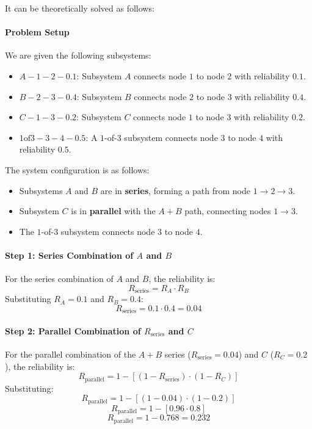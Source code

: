 \documentclass[12pt	]{article}
\begin{document}
It can be theoretically solved as follows:


\paragraph{Problem Setup}
We are given the following subsystems:
\begin{itemize}
	\item $A-1-2-0.1$: Subsystem $A$ connects node $1$ to node $2$ with reliability $0.1$.
	\item $B-2-3-0.4$: Subsystem $B$ connects node $2$ to node $3$ with reliability $0.4$.
	\item $C-1-3-0.2$: Subsystem $C$ connects node $1$ to node $3$ with reliability $0.2$.
	\item $1\text{of}3-3-4-0.5$: A $1$-of-$3$ subsystem connects node $3$ to node $4$ with reliability $0.5$.
\end{itemize}

The system configuration is as follows:
\begin{itemize}
	\item Subsystems $A$ and $B$ are in \textbf{series}, forming a path from node $1 \to 2 \to 3$.
	\item Subsystem $C$ is in \textbf{parallel} with the $A+B$ path, connecting nodes $1 \to 3$.
	\item The $1$-of-$3$ subsystem connects node $3$ to node $4$.
\end{itemize}

\paragraph{Step 1: Series Combination of $A$ and $B$}
For the series combination of $A$ and $B$, the reliability is:
\[
R_{\text{series}} = R_A \cdot R_B
\]
Substituting $R_A = 0.1$ and $R_B = 0.4$:
\[
R_{\text{series}} = 0.1 \cdot 0.4 = 0.04
\]

\paragraph{Step 2: Parallel Combination of $R_{\text{series}}$ and $C$}
For the parallel combination of the $A+B$ series ($R_{\text{series}} = 0.04$) and $C$ ($R_C = 0.2$), the reliability is:
\[
R_{\text{parallel}} = 1 - \left[(1 - R_{\text{series}}) \cdot (1 - R_C)\right]
\]
Substituting:
\[
R_{\text{parallel}} = 1 - \left[(1 - 0.04) \cdot (1 - 0.2)\right]
\]
\[
R_{\text{parallel}} = 1 - \left[0.96 \cdot 0.8\right]
\]
\[
R_{\text{parallel}} = 1 - 0.768 = 0.232
\]
\end{document}

